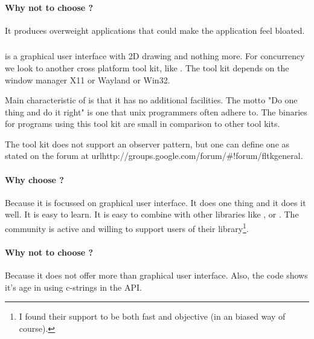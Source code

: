 \paragraph{Why not to choose ?} It produces overweight applications that could 
make the application feel bloated.

\subsubsection{}
 is a graphical user interface with 2D drawing and nothing more. For 
concurrency we look to another cross platform tool kit, like . The tool 
kit  depends on the window manager X11 or Wayland or Win32.

Main characteristic of  is that it has no additional facilities. 
The motto "Do one thing and do it right" is one that unix programmers often 
adhere to. The binaries for programs using this tool kit are small in comparison 
to other tool kits. 

The tool kit  does not support an observer pattern, but one can 
define one as stated on the forum at url{http://groups.google.com/forum/\#!forum/fltkgeneral}.

\paragraph{Why choose ?} Because it is focussed on graphical user interface.
It does one thing and it does it well. It is easy to learn. It is easy to combine with 
other libraries like ,  or . The community is active and 
willing to support users of their library\footnote{I found their support to be both fast 
and objective (in an  biased way of course).}. 

\paragraph{Why not to choose ?} Because it does not offer more than graphical 
user interface. Also, the code shows it's age in using c-strings in the API.

